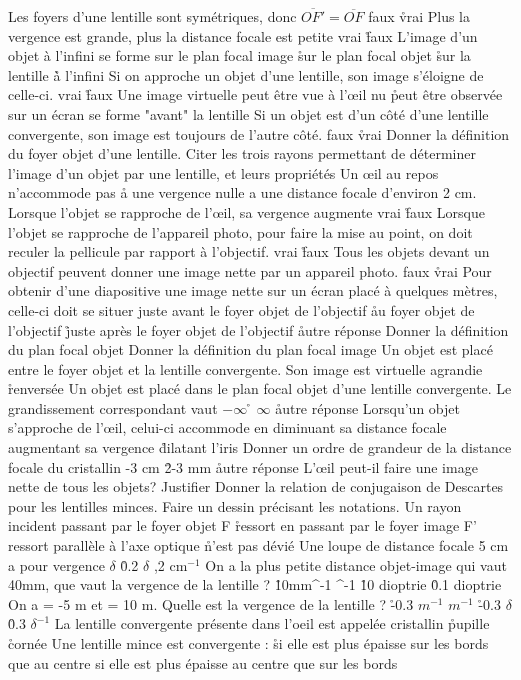 \q
Les foyers d'une lentille sont symétriques, donc $\overline{OF'}=\overline{OF}$
\rv
faux
\r
vrai
\q
Plus la vergence est grande, plus la distance focale est petite
\rv
vrai
\r
faux
\q
L'image d'un objet à l'infini se forme
\rv
sur le plan focal image
\r
sur le plan focal objet
\r
sur la lentille
\r
à l'infini
\q
Si on approche un objet d'une lentille, son image s'éloigne de celle-ci.
\rv
vrai
\r
faux
\q
Une image virtuelle
\rv
peut être vue à l'\oe il nu
\r
peut être observée sur un écran
\rv
se forme "avant" la lentille
\q
Si un objet est d'un côté d'une lentille convergente, son image est toujours de l'autre côté.
\rv
faux
\r
vrai
\q
Donner la définition du foyer objet d'une lentille.
Citer les trois rayons permettant de déterminer l'image d'un objet par une lentille, et leurs propriétés
\q
Un \oe il au repos 
\rv
n'accommode pas
\r
a une vergence nulle
\rv
a une distance focale d'environ 2 cm.
\q
Lorsque l'objet se rapproche de l'\oe il, sa vergence augmente
\rv
vrai
\r
faux
\q
Lorsque l'objet se rapproche de l'appareil photo, pour faire la mise au point, on doit reculer la pellicule par rapport à l'objectif.
\rv
vrai
\r
faux
\q
Tous les objets devant un objectif peuvent donner une image nette par un appareil photo.
\rv
faux
\r
vrai
\q
Pour obtenir d'une diapositive une image nette sur un écran placé à quelques mètres, celle-ci doit se situer
\rv
juste avant le foyer objet de l'objectif
\r
au foyer objet de l'objectif
\r
juste après le foyer objet de l'objectif
\r
autre réponse
\q
Donner la définition du plan focal objet
\q
Donner la définition du plan focal image
\q
Un objet est placé entre le foyer objet et la lentille convergente. Son image est 
\rv
virtuelle
\rv
agrandie
\r
renversée
\q
Un objet est placé dans le plan focal objet d'une lentille convergente. Le grandissement correspondant vaut
\rv
$-\infty$
\r
$\infty$
\r
autre réponse
\q
Lorsqu'un objet s'approche de l'\oe il, celui-ci accommode en
\rv
diminuant sa distance focale
\rv
augmentant sa vergence
\r
dilatant l'iris
\q
Donner un ordre de grandeur de la distance focale du cristallin
-3 cm
\r
2-3 mm
\r
autre réponse
\q
L'\oe il peut-il faire une image nette de tous les objets? Justifier
\q
Donner la relation de conjugaison de Descartes pour les lentilles minces. Faire un dessin précisant les notations.
\q
Un rayon incident passant par le foyer objet F
\r
ressort en passant par le foyer image F'
\rv
ressort parallèle à l'axe optique
\r
n'est pas dévié
\q
Une loupe de distance focale 5 cm a pour vergence 
 $\delta$
\r
0.2 $\delta$
,2 cm$^{-1}$
\q
On a la plus petite distance objet-image qui vaut 40mm, que vaut la vergence de la lentille ?
\r
10mm^{-1}
\rv
0.1mm^{-1}
\r
10 dioptrie
\r
0.1 dioptrie
\q
On a  = -5 m et  = 10 m. Quelle est la vergence de la lentille
?
\r
-0.3 $m^{-1}$
 $m^{-1}$
\r
-0.3 $\delta$
\r
0.3 $\delta^{-1}$
\q
La lentille convergente présente dans l'oeil est appelée
\rv
cristallin
\r
pupille
\r
cornée
\q 
Une lentille mince est convergente :
\r 
si elle est plus épaisse sur les bords que au centre
\rv
si elle est plus épaisse au centre que sur les bords

